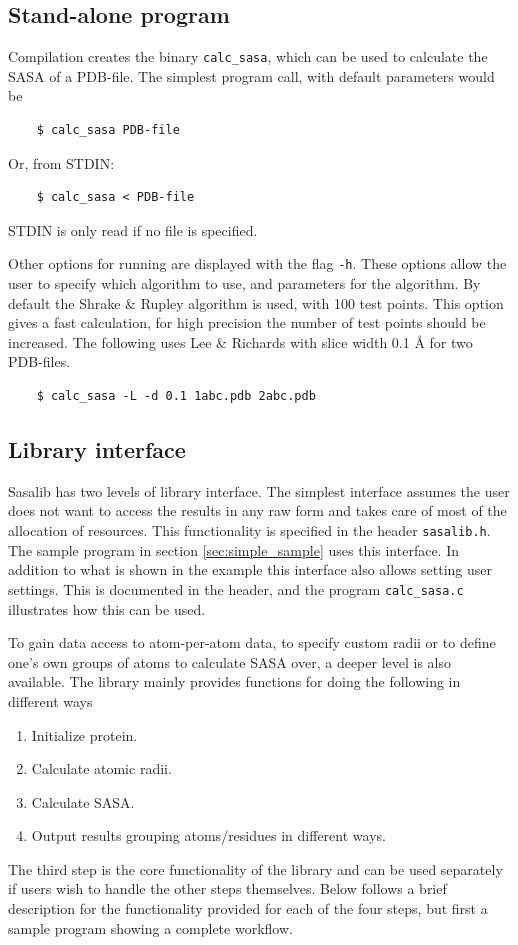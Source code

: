 \documentclass[a4paper,11pt]{article}
\begin{document}
\subsection{Stand-alone program}

Compilation creates the binary \texttt{calc\_sasa}, which can be used
to calculate the SASA of a PDB-file. The simplest program call, with
default parameters would be
\begin{verbatim}
    $ calc_sasa PDB-file
\end{verbatim}
Or, from STDIN:
\begin{verbatim} 
    $ calc_sasa < PDB-file    
\end{verbatim}
STDIN is only read if no file is specified.

Other options for running are displayed with the flag
\texttt{-h}. These options allow the user to specify which algorithm
to use, and parameters for the algorithm. By default the Shrake \&
Rupley algorithm is used, with 100 test points. This option gives a
fast calculation, for high precision the number of test points should
be increased. The following uses Lee \& Richards with slice width 0.1 Å
for two PDB-files.
\begin{verbatim}
    $ calc_sasa -L -d 0.1 1abc.pdb 2abc.pdb
\end{verbatim}

\subsection{Library interface}

Sasalib has two levels of library interface. The simplest interface
assumes the user does not want to access the results in any raw form
and takes care of most of the allocation of resources. This
functionality is specified in the header \texttt{sasalib.h}. The
sample program in section \ref{sec:simple_sample} uses this interface.
In addition to what is shown in the example this interface also allows
setting user settings. This is documented in the header, and the program
\texttt{calc_sasa.c} illustrates how this can be used.

To gain data access to atom-per-atom data, to specify custom radii or
to define one's own groups of atoms to calculate SASA over, a deeper
level is also available. The library mainly provides functions for
doing the following in different ways
\begin{enumerate}
  \item Initialize protein.
  \item Calculate atomic radii.
  \item Calculate SASA.
  \item Output results grouping atoms/residues in different ways.
\end{enumerate}
The third step is the core functionality of the library and can be
used separately if users wish to handle the other steps
themselves. Below follows a brief description for the functionality
provided for each of the four steps, but first a sample program
showing a complete workflow.
\end{document}
